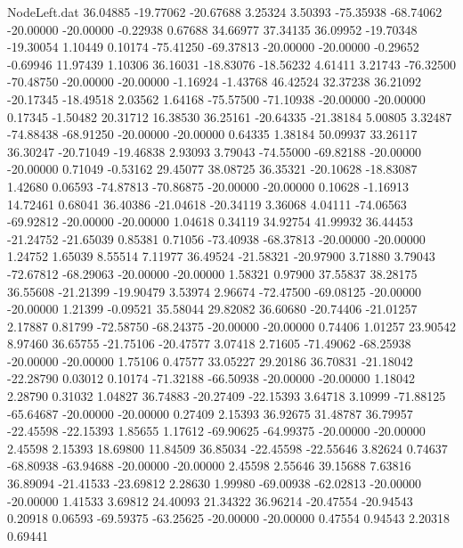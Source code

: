 \begin{filecontents}{NodeLeft.dat}
  36.04885  -19.77062  -20.67688     3.25324    3.50393  -75.35938  -68.74062  -20.00000  -20.00000   -0.22938    0.67688   34.66977   37.34135
  36.09952  -19.70348  -19.30054     1.10449    0.10174  -75.41250  -69.37813  -20.00000  -20.00000   -0.29652   -0.69946   11.97439    1.10306
  36.16031  -18.83076  -18.56232     4.61411    3.21743  -76.32500  -70.48750  -20.00000  -20.00000   -1.16924   -1.43768   46.42524   32.37238
  36.21092  -20.17345  -18.49518     2.03562    1.64168  -75.57500  -71.10938  -20.00000  -20.00000    0.17345   -1.50482   20.31712   16.38530
  36.25161  -20.64335  -21.38184     5.00805    3.32487  -74.88438  -68.91250  -20.00000  -20.00000    0.64335    1.38184   50.09937   33.26117
  36.30247  -20.71049  -19.46838     2.93093    3.79043  -74.55000  -69.82188  -20.00000  -20.00000    0.71049   -0.53162   29.45077   38.08725
  36.35321  -20.10628  -18.83087     1.42680    0.06593  -74.87813  -70.86875  -20.00000  -20.00000    0.10628   -1.16913   14.72461    0.68041
  36.40386  -21.04618  -20.34119     3.36068    4.04111  -74.06563  -69.92812  -20.00000  -20.00000    1.04618    0.34119   34.92754   41.99932
  36.44453  -21.24752  -21.65039     0.85381    0.71056  -73.40938  -68.37813  -20.00000  -20.00000    1.24752    1.65039    8.55514    7.11977
  36.49524  -21.58321  -20.97900     3.71880    3.79043  -72.67812  -68.29063  -20.00000  -20.00000    1.58321    0.97900   37.55837   38.28175
  36.55608  -21.21399  -19.90479     3.53974    2.96674  -72.47500  -69.08125  -20.00000  -20.00000    1.21399   -0.09521   35.58044   29.82082
  36.60680  -20.74406  -21.01257     2.17887    0.81799  -72.58750  -68.24375  -20.00000  -20.00000    0.74406    1.01257   23.90542    8.97460
  36.65755  -21.75106  -20.47577     3.07418    2.71605  -71.49062  -68.25938  -20.00000  -20.00000    1.75106    0.47577   33.05227   29.20186
  36.70831  -21.18042  -22.28790     0.03012    0.10174  -71.32188  -66.50938  -20.00000  -20.00000    1.18042    2.28790    0.31032    1.04827
  36.74883  -20.27409  -22.15393     3.64718    3.10999  -71.88125  -65.64687  -20.00000  -20.00000    0.27409    2.15393   36.92675   31.48787
  36.79957  -22.45598  -22.15393     1.85655    1.17612  -69.90625  -64.99375  -20.00000  -20.00000    2.45598    2.15393   18.69800   11.84509
  36.85034  -22.45598  -22.55646     3.82624    0.74637  -68.80938  -63.94688  -20.00000  -20.00000    2.45598    2.55646   39.15688    7.63816
  36.89094  -21.41533  -23.69812     2.28630    1.99980  -69.00938  -62.02813  -20.00000  -20.00000    1.41533    3.69812   24.40093   21.34322
  36.96214  -20.47554  -20.94543     0.20918    0.06593  -69.59375  -63.25625  -20.00000  -20.00000    0.47554    0.94543    2.20318    0.69441

\end{filecontents}
